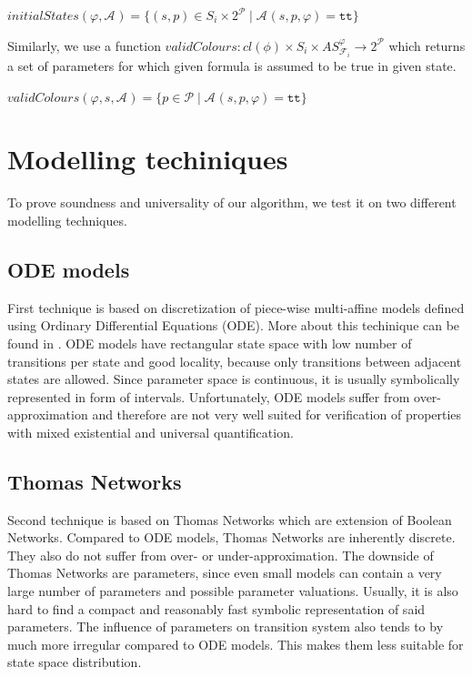 \documentclass[12pt,oneside, draft]{fithesis2}
\newcommand{\as}[1][]{\ensuremath{\mathcal{A}_{#1}}}
\newcommand{\ASphi}{\ensuremath{AS_{\kf{i}{}}^\varphi}}
\newcommand{\true}{\ensuremath{\texttt{tt}}}
\newcommand{\kf}[2]{\ensuremath{\mathcal{F}^{#2}_{#1}}}
\newcommand{\params}{\mathcal{P}}
\begin{document}
			\begin{center}
				$initialStates(\varphi, \as) = \{ (s, p) \in S_i \times 2^\params \mid \as(s, p, \varphi) = \true \} $
			\end{center}			

		   Similarly, we use a function $validColours : cl(\phi) \times S_i \times \ASphi \rightarrow 2^\mathcal{P}	$ which returns a set of parameters for which given formula is assumed to be true in given state. 
			
			\begin{center}
				$validColours(\varphi, s, \as) = \{ p \in \params \mid \as(s, p, \varphi) = \true \}$
			\end{center}

	\chapter{Modelling techiniques}
	
			To prove soundness and universality of our algorithm, we test it on two different modelling techniques. 

		\section{ODE models}	
				
			First technique is based on discretization of piece-wise multi-affine models defined using Ordinary Differential Equations (ODE). More about this techinique can be found in \cite{IFAC}. ODE models have rectangular state space with low number of transitions per state and good locality, because only transitions between adjacent states are allowed. Since parameter space is continuous, it is usually symbolically represented in form of intervals. Unfortunately, ODE models suffer from over-approximation and therefore are not very well suited for verification of properties with mixed existential and universal quantification.
	
		\section{Thomas Networks}
			Second technique is based on Thomas Networks \cite{Thomas} which are extension of Boolean Networks. Compared to ODE models, Thomas Networks are inherently discrete. They also do not suffer from over- or under-approximation. The downside of Thomas Networks are parameters, since even small models can contain a very large number of parameters and possible parameter valuations. Usually, it is also hard to find a compact and reasonably fast symbolic representation of said parameters. The influence of parameters on transition system also tends to by much more irregular compared to ODE models. This makes them less suitable for state space distribution.
			
\end{document}
